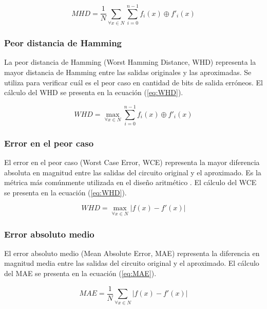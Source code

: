 \begin{equation} \label{eq:MHD}
  MHD = \frac{1}{N} \sum_{\forall x \in N} \sum_{i=0}^{n-1} f_i(x) \oplus f'_i(x)
\end{equation}

\subsubsection{Peor distancia de Hamming}

La peor distancia de Hamming (Worst Hamming Distance, WHD) representa la mayor
distancia de Hamming entre las salidas originales y las aproximadas. Se utiliza
para verificar cuál es el peor caso en cantidad de bits de salida erróneos. El
cálculo del WHD se presenta en la ecuación (\ref{eq:WHD}).

\begin{equation} \label{eq:WHD}
  WHD = \max_{\forall x \in N} \sum_{i=0}^{n-1} f_i(x) \oplus f'_i(x)
\end{equation}

\subsubsection{Error en el peor caso}

El error en el peor caso (Worst Case Error, WCE) representa la mayor diferencia
absoluta en magnitud entre las salidas del circuito original y el aproximado.
Es la métrica más comúnmente utilizada en el diseño aritmético
\cite{ammes_two-level_2022}. El cálculo del WCE se presenta en la ecuación
(\ref{eq:WHD}).

\begin{equation} \label{eq:WCE}
  WHD = \max_{\forall x \in N} \left| f(x) - f'(x) \right|
\end{equation}

\subsubsection{Error absoluto medio}

El error absoluto medio (Mean Absolute Error, MAE) representa la diferencia en
magnitud media entre las salidas del circuito original y el aproximado. El
cálculo del MAE se presenta en la ecuación (\ref{eq:MAE}).

\begin{equation} \label{eq:MAE}
  MAE = \frac{1}{N} \sum_{\forall x \in N} \left| f(x) - f'(x) \right|
\end{equation}

